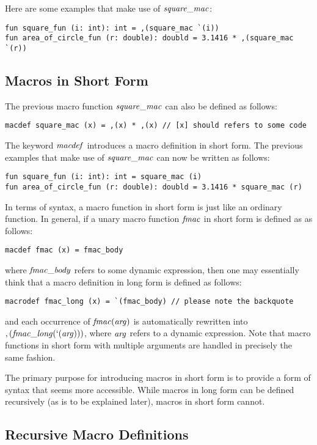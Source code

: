 Here are some examples that make use of ${\it square\_mac}$:
\begin{verbatim}
fun square_fun (i: int): int = ,(square_mac `(i))
fun area_of_circle_fun (r: double): doubld = 3.1416 * ,(square_mac `(r))
\end{verbatim}

\subsection{Macros in Short Form}
The previous macro function ${\it square\_mac}$ can also be defined as
follows:
\begin{verbatim}
macdef square_mac (x) = ,(x) * ,(x) // [x] should refers to some code
\end{verbatim}

The keyword ${\it macdef}$ introduces a macro definition in short form.
The previous examples that make use of ${\it square\_mac}$ can now be
written as follows:
\begin{verbatim}
fun square_fun (i: int): int = square_mac (i)
fun area_of_circle_fun (r: double): doubld = 3.1416 * square_mac (r)
\end{verbatim}

In terms of syntax, a macro function in short form is just like an ordinary
function.  In general, if a unary macro function ${\it fmac}$ in short
form is defined as as follows:
\begin{verbatim}
macdef fmac (x) = fmac_body
\end{verbatim}
where ${\it fmac\_body}$ refers to some dynamic expression, then one may
essentially think that a macro definition in long form is defined as
follows:
\begin{verbatim}
macrodef fmac_long (x) = `(fmac_body) // please note the backquote
\end{verbatim}
and each occurrence of ${\it fmac}({\it arg})$ is automatically rewritten
into $,({\it fmac\_long}(`({\it arg})))$, where ${\it arg}$ refers to a
dynamic expression. Note that macro functions in short form with multiple
arguments are handled in precisely the same fashion.

The primary purpose for introducing macros in short form is to provide a
form of syntax that seems more accessible. While macros in long form can be
defined recursively (as is to be explained later), macros in short form
cannot.

\subsection{Recursive Macro Definitions}



